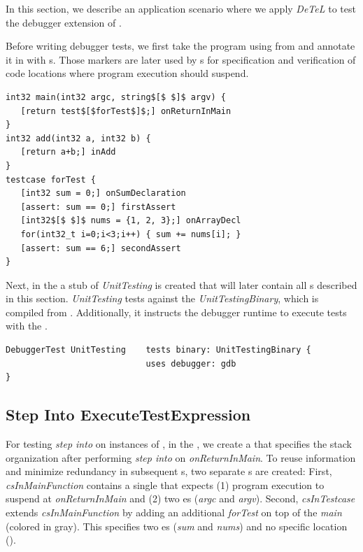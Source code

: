 In this section, we describe an application scenario where we apply \emph{DeTeL}  
to test the debugger extension of . 

Before writing debugger tests, we first take the program using 
from  and annotate it in 
with s. Those markers are later used by s 
for specification and verification of code locations where program
execution should suspend.

\begin{lstlisting}[language=markerDSL,caption=Annotated
program,label=lst:annotatedProg] 
int32 main(int32 argc, string$[$ $]$ argv) {
   [return test$[$forTest$]$;] onReturnInMain
}
int32 add(int32 a, int32 b) {
   [return a+b;] inAdd
}
testcase forTest {
   [int32 sum = 0;] onSumDeclaration
   [assert: sum == 0;] firstAssert
   [int32$[$ $]$ nums = {1, 2, 3};] onArrayDecl
   for(int32_t i=0;i<3;i++) { sum += nums[i]; }
   [assert: sum == 6;] secondAssert
}
\end{lstlisting}	

Next, in the  a stub of 
\emph{UnitTesting} is created that will later contain all s described in this
section. \emph{UnitTesting} tests against the 
\emph{UnitTestingBinary}, which is compiled from .
Additionally, it instructs the debugger runtime to execute tests with the
.

\begin{lstlisting}[language=testingDSL,caption=\ic{DebuggerTest} stub,
label=lst:DebuggerTestingStub]
DebuggerTest UnitTesting    tests binary: UnitTestingBinary {
                            uses debugger: gdb
}  
\end{lstlisting}

\subsection{Step Into ExecuteTestExpression}

For testing \emph{step into} on instances of ,
in the , we create a  that specifies
the stack organization after performing \emph{step
into} on \emph{onReturnInMain}. To reuse information and 
minimize redundancy in subsequent
s, two separate 
s are created: First, \emph{csInMainFunction} 
contains a single  that expects (1) program execution to suspend
at \emph{onReturnInMain} and (2) two es (\emph{argc} and
\emph{argv}). Second, \emph{csInTestcase} extends \emph{csInMainFunction} by adding an
additional  \emph{forTest} on top of the 
\emph{main} (colored in gray). This  specifies two es
(\emph{sum} and \emph{nums}) and no specific location
().

